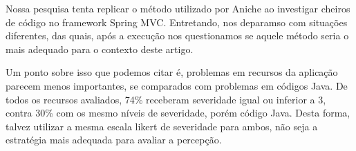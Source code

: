 Nossa pesquisa tenta replicar o método utilizado por Aniche \cite{FinavaroAniche2016} ao investigar cheiros de código no framework Spring MVC. Entretando, nos deparamso com situações diferentes, das quais, após a execução nos questionamos se aquele método seria o mais adequado para o contexto deste artigo. 

Um ponto sobre isso que podemos citar é, problemas em recursos da aplicação parecem menos importantes, se comparados com problemas em códigos Java. De todos os recursos avaliados, 74\% receberam severidade igual ou inferior a 3, contra 30\% com os mesmo níveis de severidade, porém código Java.  Desta forma, talvez utilizar a mesma escala likert de severidade para ambos, não seja a estratégia mais adequada para avaliar a percepção. 

